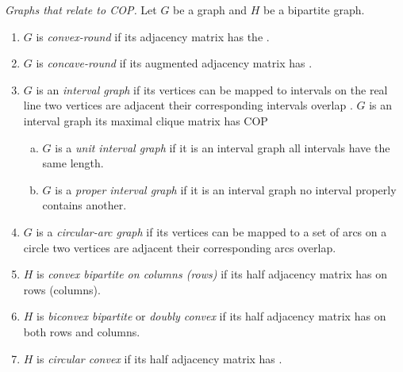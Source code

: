 \begin{definition}{\emph{Graphs that relate to
      COP.\cite[Def.~2.5]{d08phd}}} %
  \label{def:graphwithcop} %
  Let $G$ be a graph and $H$ be a bipartite graph.

  \begin{enumerate}
  \item $G$ is \emph{convex-round} if its adjacency matrix has the
    \CROP.
  \item \label{def::concave-round} $G$ is \emph{concave-round} if its
    augmented adjacency matrix has \CROP. 
  \item $G$ is an \emph{interval graph} if its vertices can be mapped
    to intervals on the real line \stt two vertices are adjacent \iff
    their corresponding intervals overlap .
    $G$ is an interval graph \iff its maximal clique matrix has COP
    \cite{fg65}

    \begin{enumerate}[a.]
    \item $G$ is a \emph{unit interval graph} if it is an interval
      graph \stt all intervals have the same length.\endnotemark[2]
    \item $G$ is a \emph{proper interval graph} if it is an interval
      graph \stt no interval properly contains another. 
    \end{enumerate}
 \item $G$ is a \emph{circular-arc graph} if its vertices can be
    mapped to a set of arcs on a circle \stt two vertices are adjacent
    \iff their corresponding arcs overlap.
  \item $H$ is \emph{convex bipartite on columns (rows)} if its half
    adjacency matrix has \COP on rows (columns).%
    \label{def::convexbi}
  \item $H$ is \emph{biconvex bipartite} or \emph{doubly
      convex}\cite{yc95} if its half adjacency matrix has \COP on both
    rows and columns.
  \item $H$ is \emph{circular convex} if its half adjacency matrix has
    \CROP.
  \end{enumerate}
\end{definition}

